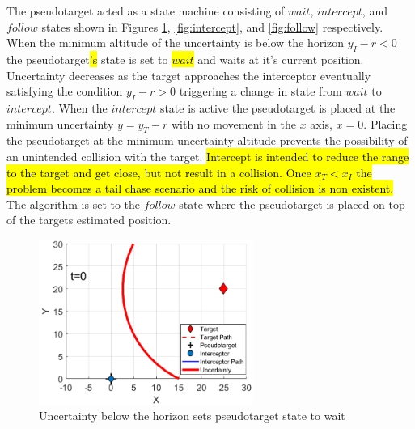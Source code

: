 \documentclass[conference]{IEEEtran}
\begin{document}
The pseudotarget acted as a state machine consisting of $wait$, $intercept$, and $follow$ states shown in Figures \ref{fig:wait}, \ref{fig:intercept}, and \ref{fig:follow} respectively. When the minimum altitude of the uncertainty is below the horizon $y_I-r<0$ the pseudotarget\hl{'s} state is set to \hl{$wait$} and waits at it's current position. Uncertainty decreases as the target approaches the interceptor eventually satisfying the condition $y_I-r >0$ triggering a change in state from $wait$ to $intercept$. When the $intercept$ state is active the pseudotarget is placed at the minimum uncertainty $y=y_T-r$ with no movement in the $x$ axis, $x=0$. Placing the pseudotarget at the minimum uncertainty altitude prevents the possibility of an unintended collision with the target. \hl{Intercept is intended to reduce the range to the target and get close, but not result in a collision. Once $x_T<x_I$ the problem becomes a tail chase scenario and the risk of collision is non existent.} The algorithm is set to the $follow$ state where the pseudotarget is placed on top of the targets estimated position. 









\begin{figure}[H]
	\centering
	\includegraphics[width=7cm]{wait}
	\caption{Uncertainty below the horizon sets pseudotarget state to wait}
	\label{fig:wait}
\end{figure}
\end{document}
